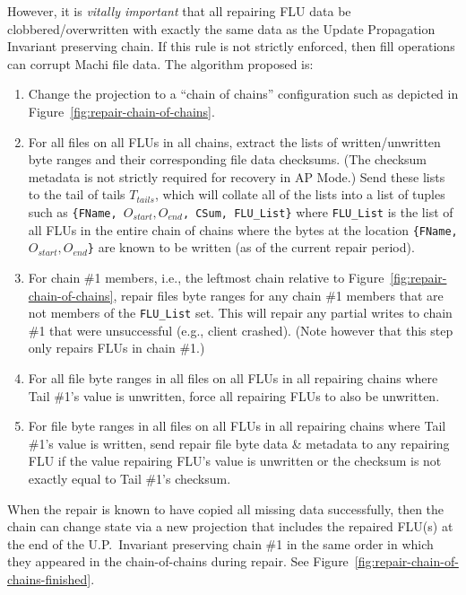 \documentclass[preprint,10pt]{sigplanconf}
\begin{document}
However, it is {\em vitally important} that all repairing FLU data be
clobbered/overwritten with exactly the same data as the Update
Propagation Invariant preserving chain.  If this rule is not strictly
enforced, then fill operations can corrupt Machi file data.  The
algorithm proposed is:

\begin{enumerate}

\item Change the projection to a ``chain of chains'' configuration
  such as depicted in Figure~\ref{fig:repair-chain-of-chains}.

\item For all files on all FLUs in all chains, extract the lists of
  written/unwritten byte ranges and their corresponding file data
  checksums.  (The checksum metadata is not strictly required for
  recovery in AP Mode.)
  Send these lists to the tail of tails
  $T_{tails}$, which will collate all of the lists into a list of
  tuples such as {\tt \{FName, $O_{start}, O_{end}$, CSum, FLU\_List\}}
  where {\tt FLU\_List} is the list of all FLUs in the entire chain of
  chains where the bytes at the location {\tt \{FName, $O_{start},
    O_{end}$\}} are known to be written (as of the current repair period).

\item For chain \#1 members, i.e., the
  leftmost chain relative to Figure~\ref{fig:repair-chain-of-chains},
  repair files byte ranges for any chain \#1 members that are not members
  of the {\tt FLU\_List} set.  This will repair any partial
  writes to chain \#1 that were unsuccessful (e.g., client crashed).
  (Note however that this step only repairs FLUs in chain \#1.)

\item For all file byte ranges in all files on all FLUs in all
  repairing chains where Tail \#1's value is unwritten, force all
  repairing FLUs to also be unwritten.

\item For file byte ranges in all files on all FLUs in all repairing
  chains where Tail \#1's value is written, send repair file byte data
  \& metadata to any repairing FLU if the value repairing FLU's
  value is unwritten or the checksum is not exactly equal to Tail \#1's
  checksum.

\end{enumerate}

When the repair is known to have copied all missing data successfully,
then the chain can change state via a new projection that includes the
repaired FLU(s) at the end of the U.P.~Invariant preserving chain \#1
in the same order in which they appeared in the chain-of-chains during
repair.  See Figure~\ref{fig:repair-chain-of-chains-finished}.
\end{document}

